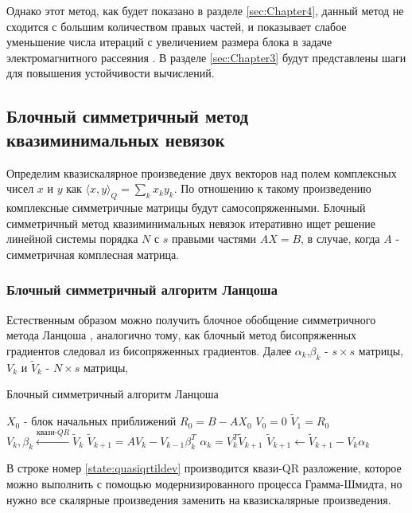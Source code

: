 Однако этот метод, как будет показано в разделе \ref{sec:Chapter4}, данный метод 
не сходится с большим количеством правых частей, и показывает слабое уменьшение 
числа итераций с увеличением размера блока в задаче электромагнитного рассеяния 
\cite{stavtsev2009application}. В разделе \ref{sec:Chapter3} будут представлены
шаги для повышения устойчивости вычислений. 
\subsection[Блочный симметричный метод квазиминимальных невязок]{Блочный симметричный метод квазиминимальных невязок}
Определим квазискалярное произведение двух векторов над полем комплексных чисел
 $x$ и $y$ как $\langle x,y\rangle _Q=\sum_k x_k y_k$. По отношению к такому произведению
 комплексные симметричные матрицы будут самосопряженными. Блочный симметричный метод квазиминимальных невязок \cite{doi:10.1137/0917019} 
 итеративно ищет решение линейной системы порядка $N$ с $s$ правыми частями $AX=B$, в случае, когда $A$ - 
 симметричная комплесная матрица.   
\subsubsection[Блочный симметричный алгоритм Ланцоша]{Блочный симметричный алгоритм Ланцоша}
Естественным образом можно получить блочное обобщение симметричного метода Ланцоша \cite{doi:10.1137/0917019}, 
аналогично тому, как блочный метод бисопряженных градиентов следовал из бисопряженных градиентов.
Далее $\alpha_k$,$\beta_k$ - $s \times s$ матрицы, $V_k$ и $\tilde{V}_k$ - $N \times s$ 
матрицы, 
\begin{algorithm}[H]
    \caption{Блочный симметричный алгоритм Ланцоша}
    \begin{algorithmic}[1]
        \State $X_0$ - блок начальных приближений
        \State $R_0 = B - AX_0$
        \State $V_0 = 0$
        \State $\tilde{V}_1 = R_0$
            \State $V_k, \beta_k \xleftarrow{\text{квази-} QR} \tilde{V}_k$ \label{state:quasiqrtildev}
            \State $\tilde{V}_{k+1} = AV_k - V_{k-1}\beta_k^T$
            \State $\alpha_k = V_k^T \tilde{V}_{k+1}$
            \State $\tilde{V}_{k+1} \gets \tilde{V}_{k+1} - V_k \alpha_k$
        \EndFor
    \end{algorithmic}
\end{algorithm}
В строке номер \ref{state:quasiqrtildev} производится квази-QR разложение, которое 
можно выполнить с помощью модернизированного процесса Грамма-Шмидта, но нужно все скалярные
произведения заменить на квазискалярные произведения. 

